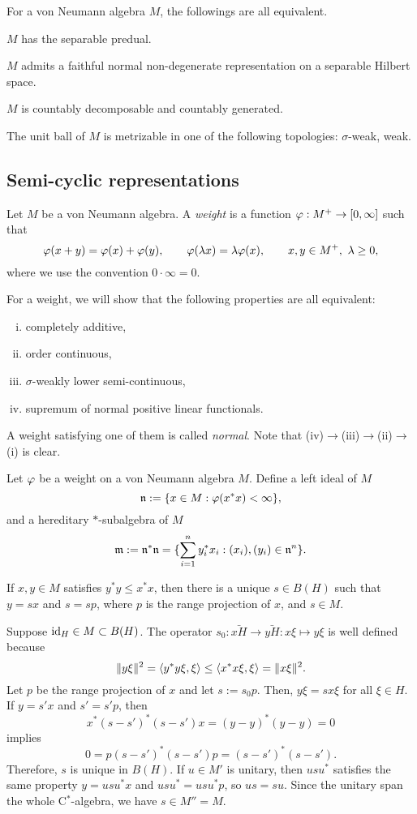 \documentclass{../../small}
\begin{document}
\begin{prop}
For a von Neumann algebra $M$, the followings are all equivalent.
\begin{parts}
\item $M$ has the separable predual.
\item $M$ admits a faithful normal non-degenerate representation on a separable Hilbert space.
\item $M$ is countably decomposable and countably generated.
\item The unit ball of $M$ is metrizable in one of the following topologies: $\sigma$-weak, weak.
\end{parts}
\end{prop}


\subsection{Semi-cyclic representations}


\begin{defn}[Weights]
Let $M$ be a von Neumann algebra.
A \emph{weight} is a function $\varphi:M^+\to[0,\infty]$ such that
\[\varphi(x+y)=\varphi(x)+\varphi(y),\qquad\varphi(\lambda x)=\lambda\varphi(x),\qquad x,y\in M^+,\ \lambda\ge0,\]
where we use the convention $0\cdot\infty=0$.
\end{defn}
For a weight, we will show that the following properties are all equivalent:
\begin{enumerate}[(i)]
\item completely additive,
\item order continuous,
\item $\sigma$-weakly lower semi-continuous,
\item supremum of normal positive linear functionals.
\end{enumerate}
A weight satisfying one of them is called \emph{normal}.
Note that (iv)$\to$(iii)$\to$(ii)$\to$(i) is clear.

\begin{defn}
Let $\varphi$ be a weight on a von Neumann algebra $M$.
Define a left ideal of $M$
\[\mathfrak{n}:=\{x\in M:\varphi(x^*x)<\infty\},\]
and a hereditary $*$-subalgebra of $M$
\[\mathfrak{m}:=\mathfrak{n}^*\mathfrak{n}=\{\sum_{i=1}^ny_i^*x_i:(x_i),(y_i)\in\mathfrak{n}^n\}.\]
\end{defn}


\begin{lem}
If $x,y\in M$ satisfies $y^*y\le x^*x$, then there is a unique $s\in B(H)$ such that $y=sx$ and $s=sp$, where $p$ is the range projection of $x$, and $s\in M$.
\end{lem}
\begin{pf}
Suppose $\operatorname{id}_H\in M\subset B(H)$.
The operator $s_0:\bar{xH}\to\bar{yH}:x\xi\mapsto y\xi$ is well defined because
\[\|y\xi\|^2=\langle y^*y\xi,\xi\rangle\le\langle x^*x\xi,\xi\rangle=\|x\xi\|^2.\]
Let $p$ be the range projection of $x$ and let $s:=s_0p$.
Then, $y\xi=sx\xi$ for all $\xi\in H$.
If $y=s'x$ and $s'=s'p$, then
\[x^*(s-s')^*(s-s')x=(y-y)^*(y-y)=0\]
implies
\[0=p(s-s')^*(s-s')p=(s-s')^*(s-s').\]
Therefore, $s$ is unique in $B(H)$.
If $u\in M'$ is unitary, then $usu^*$ satisfies the same property $y=usu^*x$ and $usu^*=usu^*p$, so $us=su$.
Since the unitary span the whole C$^*$-algebra, we have $s\in M''=M$.
\end{pf}
\end{document}
